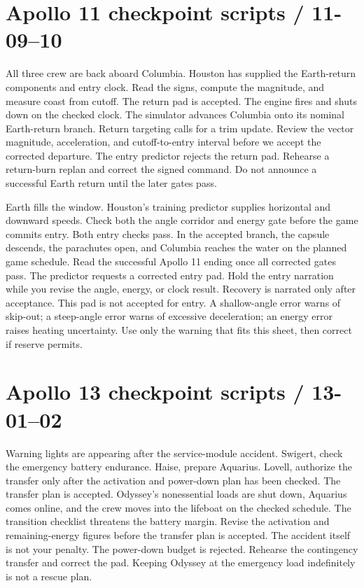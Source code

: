 \clearpage
\section*{Apollo 11 checkpoint scripts / 11-09--10}
{All three crew are back aboard Columbia.
Houston has supplied the Earth-return components and entry clock.
Read the signs, compute the magnitude, and measure coast from cutoff.}
{The return pad is accepted.
The engine fires and shuts down on the checked clock.
The simulator advances Columbia onto its nominal Earth-return branch.}
{Return targeting calls for a trim update.
Review the vector magnitude, acceleration, and cutoff-to-entry
interval before we accept the corrected departure.}
{The entry predictor rejects the return pad.
Rehearse a return-burn replan and correct the signed command.
Do not announce a successful Earth return until the later gates pass.}

{Earth fills the window. Houston's training predictor supplies
horizontal and downward speeds. Check both the angle corridor
and energy gate before the game commits entry.}
{Both entry checks pass.
In the accepted branch, the capsule descends, the parachutes open,
and Columbia reaches the water on the planned game schedule.
Read the successful Apollo 11 ending once all corrected gates pass.}
{The predictor requests a corrected entry pad.
Hold the entry narration while you revise the angle, energy,
or clock result. Recovery is narrated only after acceptance.}
{This pad is not accepted for entry.
A shallow-angle error warns of skip-out; a steep-angle error warns
of excessive deceleration; an energy error raises heating uncertainty.
Use only the warning that fits this sheet, then correct if reserve permits.}

\clearpage
\section*{Apollo 13 checkpoint scripts / 13-01--02}
{Warning lights are appearing after the service-module accident.
Swigert, check the emergency battery endurance.
Haise, prepare Aquarius. Lovell, authorize the transfer only after
the activation and power-down plan has been checked.}
{The transfer plan is accepted.
Odyssey's nonessential loads are shut down, Aquarius comes online,
and the crew moves into the lifeboat on the checked schedule.}
{The transition checklist threatens the battery margin.
Revise the activation and remaining-energy figures before the
transfer plan is accepted. The accident itself is not your penalty.}
{The power-down budget is rejected.
Rehearse the contingency transfer and correct the pad.
Keeping Odyssey at the emergency load indefinitely is not a rescue plan.}

